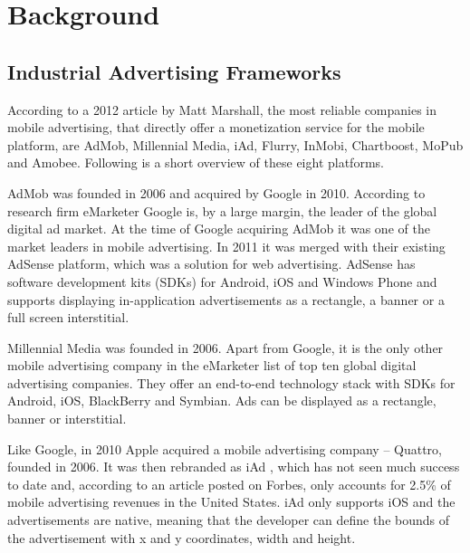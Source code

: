 \chapter{Background}

\section{Industrial Advertising Frameworks}

According to a 2012 article by Matt Marshall, the most reliable companies in mobile advertising, that directly offer a monetization service for the mobile platform, are AdMob, Millennial Media, iAd, Flurry, InMobi, Chartboost, MoPub and Amobee. \cite{mmarshall-top10} Following is a short overview of these eight platforms.

AdMob was founded in 2006 and acquired by Google in 2010. \cite{crunchbase-admob} According to research firm eMarketer Google is, by a large margin, the leader of the global digital ad market. \cite{emarketer-google} At the time of Google acquiring AdMob it was one of the market leaders in mobile advertising. \cite{google-admob} In 2011 it was merged with their existing AdSense platform, which was a solution for web advertising. \cite{admob-adsense} AdSense has software development kits (SDKs) for Android, iOS and Windows Phone \cite{admob-sdk}  and supports displaying in-application advertisements as a rectangle, a banner \cite{admob-banner} or a full screen interstitial.\cite{admob-interstitial}

Millennial Media was founded in 2006. \cite{crunchbase-millenial} Apart from Google, it is the only other mobile advertising company in the eMarketer list of top ten global digital advertising companies. \cite{emarketer-google} They offer an end-to-end technology stack with SDKs for Android, iOS, BlackBerry and Symbian. \cite{millenial-sdk} Ads can be displayed as a rectangle, banner or interstitial. \cite{millenial-android}

Like Google, in 2010 Apple acquired a mobile advertising company -- Quattro, founded in 2006. \cite{crunchbase-quattro} It was then rebranded as iAd \cite{forbes-iad}, which has not seen much success to date and, according to an article posted on Forbes, only accounts for 2.5\% of mobile advertising revenues in the United States. \cite{forbes-iad2} iAd only supports iOS and the advertisements are native, meaning that the developer can define the bounds of the advertisement with x and y coordinates, width and height. \cite{iad-tutorial}


